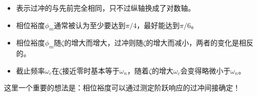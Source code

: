 \begin{itemize}
    \item 表示过冲的与先前完全相同，只不过纵轴换成了对数轴。
    \item 相位裕度$\phi_m$通常被认为至少要达到$\pi/4$，最好能达到$\pi/6$。
    \item 相位裕度$\phi_m$随$\zeta$的增大而增大，过冲则随$\zeta$的增大而减小，两者的变化是相反的。
    \item 截止频率$\omega_c$在$\zeta$接近零时基本等于$\omega_n$，随着$\zeta$的增大$\omega_c$会变得略微小于$\omega_n$。
\end{itemize}


这里一个重要的想法是：相位裕度可以通过测定阶跃响应的过冲间接确定！